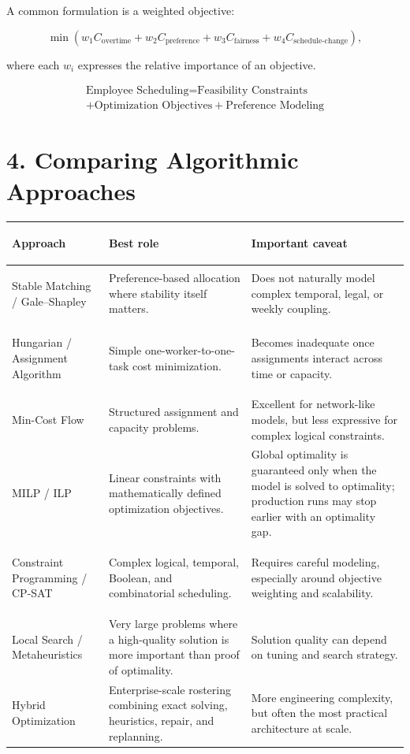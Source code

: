 \documentclass[11pt]{article}
\begin{document}
A common formulation is a weighted objective:

\[
\min
\left(
w_1 C_{\text{overtime}}
+
w_2 C_{\text{preference}}
+
w_3 C_{\text{fairness}}
+
w_4 C_{\text{schedule-change}}
\right),
\]

where each \(w_i\) expresses the relative importance of an objective.

\begin{keybox}
\[
\boxed{\begin{gathered}
\text{Employee Scheduling}=\text{Feasibility Constraints}\\
+\text{Optimization Objectives}+\text{Preference Modeling}
\end{gathered}}
\]
\end{keybox}

\section{4. Comparing Algorithmic Approaches}

\small
\begin{tabularx}{\textwidth}{>{\bfseries\raggedright\arraybackslash}p{} Y Y}
\toprule
Approach & Best role & Important caveat \\
\midrule
Stable Matching / Gale--Shapley
& Preference-based allocation where stability itself matters.
& Does not naturally model complex temporal, legal, or weekly coupling. \\

Hungarian / Assignment Algorithm
& Simple one-worker-to-one-task cost minimization.
& Becomes inadequate once assignments interact across time or capacity. \\

Min-Cost Flow
& Structured assignment and capacity problems.
& Excellent for network-like models, but less expressive for complex logical constraints. \\

MILP / ILP
& Linear constraints with mathematically defined optimization objectives.
& Global optimality is guaranteed only when the model is solved to optimality; production runs may stop earlier with an optimality gap. \\

Constraint Programming / CP-SAT
& Complex logical, temporal, Boolean, and combinatorial scheduling.
& Requires careful modeling, especially around objective weighting and scalability. \\

Local Search / Metaheuristics
& Very large problems where a high-quality solution is more important than proof of optimality.
& Solution quality can depend on tuning and search strategy. \\

Hybrid Optimization
& Enterprise-scale rostering combining exact solving, heuristics, repair, and replanning.
& More engineering complexity, but often the most practical architecture at scale. \\
\bottomrule
\end{tabularx}
\normalsize
\end{document}
